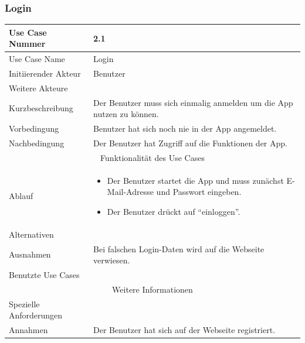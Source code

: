 \documentclass[10pt,a4paper]{article}
\begin{document}
\subsubsection{Login}
	\begin{tabular}{|l|p{.5\linewidth}|}
	\hline Use Case Nummer & 2.1 \\ 
	\hline Use Case Name & Login \\ 
	\hline Initiierender Akteur & Benutzer \\
	\hline Weitere Akteure &  \\
	\hline Kurzbeschreibung & Der Benutzer muss sich einmalig anmelden um die App nutzen zu können. \\
	\hline Vorbedingung & Benutzer hat sich noch nie in der App angemeldet. \\
	\hline Nachbedingung & Der Benutzer hat Zugriff auf die Funktionen der App. \\
	\hline \multicolumn{2}{|c|}{Funktionalität des Use Cases}\\
	\hline Ablauf & \begin{itemize}
		\item Der Benutzer startet die App und muss zunächst E-Mail-Adresse und Passwort eingeben.
		\item Der Benutzer drückt auf ``einloggen''.
	\end{itemize} \\
	\hline Alternativen &  \\
	\hline Ausnahmen & Bei falschen Login-Daten wird auf die Webseite verwiesen. \\
	\hline Benutzte Use Cases &  \\
	\hline \multicolumn{2}{|c|}{Weitere Informationen} \\
	\hline Spezielle Anforderungen &  \\
	\hline Annahmen & Der Benutzer hat sich auf der Webseite registriert. \\
	\hline
	\end{tabular}
\end{document}
